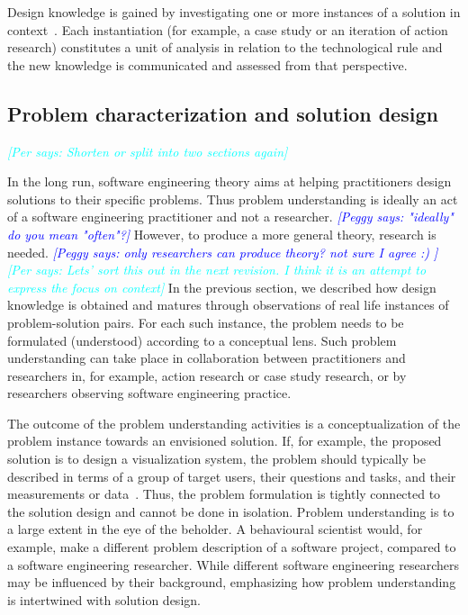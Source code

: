 \documentclass[graybox]{svmult}
\newcommand{\peggy}[1]{\textcolor{blue}{{\it [Peggy says: #1]}}}
\newcommand{\per}[1]{\textcolor{cyan}{{\it [Per says: #1]}}}
\newcommand{\peggy}[1]{}
\newcommand{\per}[1]{}
\begin{document}
Design knowledge is gained by investigating one or more instances of a solution in context~\cite{wieringa_what_2014}. Each instantiation (for example, a case study or an iteration of action research) constitutes a unit of analysis in relation to the technological rule and the new knowledge is communicated and assessed from that perspective. 

\subsection{Problem characterization and solution design}
\per{Shorten or split into two sections again}



In the long run, software engineering theory aims at helping practitioners design solutions to their specific problems. Thus problem understanding is ideally an act of a software engineering practitioner and not a researcher.
\peggy{"ideally" do you mean "often"?}
 However, to produce a more general theory, research is needed. 
 \peggy{only researchers can produce theory? not sure I agree :) } \per{Lets' sort this out in the next revision. I think it is an attempt to express the focus on context}
 In the previous section, we described how design knowledge is obtained and matures through observations of real life instances of problem-solution pairs. For each such instance, the problem needs to be formulated (understood) according to a conceptual lens. Such problem understanding can take place in collaboration between practitioners and researchers in, for example, action research or case study research, or by researchers observing software engineering practice.


The outcome of the problem understanding activities is a conceptualization of the problem instance towards an envisioned solution. If, for example, the proposed solution is to design a visualization system, the problem should typically be described in terms of a group of target users, their questions and tasks, and their measurements or data~\cite{meyer_nested_2015}. Thus, the problem formulation is tightly connected to the solution design and cannot be done in isolation. Problem understanding is to a large extent in the eye of the beholder. A behavioural scientist would, for example,  make a different problem description of a software project, compared to a software engineering researcher. While different software engineering researchers may be influenced by their background, emphasizing how problem understanding is intertwined with solution design.
\end{document}
